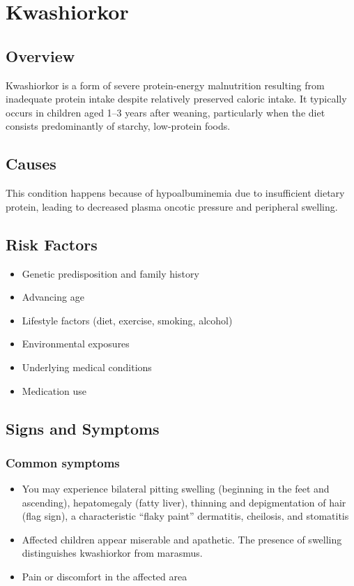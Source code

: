 \chapter{Kwashiorkor}
\label{sec:Kwashiorkor}

\section{Overview}
Kwashiorkor is a form of severe protein-energy malnutrition resulting from inadequate protein intake despite relatively preserved caloric intake. It typically occurs in children aged 1--3 years after weaning, particularly when the diet consists predominantly of starchy, low-protein foods.
\section{Causes}
This condition happens because of hypoalbuminemia due to insufficient dietary protein, leading to decreased plasma oncotic pressure and peripheral swelling.     
\section{Risk Factors}

\begin{itemize}[noitemsep]
  \item Genetic predisposition and family history
  \item Advancing age
  \item Lifestyle factors (diet, exercise, smoking, alcohol)
  \item Environmental exposures
  \item Underlying medical conditions
  \item Medication use
\end{itemize}
\section{Signs and Symptoms}

\subsection{Common symptoms}
\begin{itemize}[noitemsep]
  \item You may experience bilateral pitting swelling (beginning in the feet and ascending), hepatomegaly (fatty liver), thinning and depigmentation of hair (flag sign), a characteristic ``flaky paint'' dermatitis, cheilosis, and stomatitis
  \item Affected children appear miserable and apathetic. The presence of swelling distinguishes kwashiorkor from marasmus.
  \item Pain or discomfort in the affected area
  \end{itemize}

